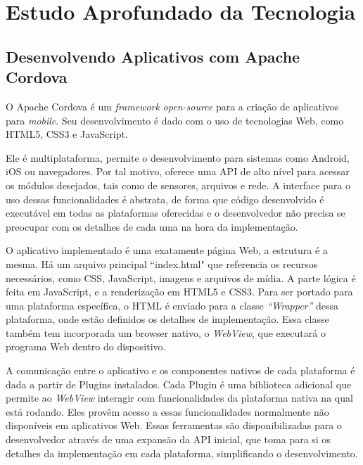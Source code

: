 \documentclass[a4paper,12pt]{article}
\begin{document}
%
%








\newpage

\section{Estudo Aprofundado da Tecnologia}

\subsection{Desenvolvendo Aplicativos com Apache Cordova}

O Apache Cordova é um \emph{framework} \emph{open-source} para a criação de aplicativos para \emph{mobile}. Seu desenvolvimento é dado com o uso de tecnologias Web, como HTML5, CSS3 e JavaScript.

Ele é multiplataforma, permite o desenvolvimento para sistemas como Android, iOS ou navegadores. Por tal motivo, oferece uma API de alto nível para acessar os módulos desejados, tais como de sensores, arquivos e rede. A interface para o uso dessas funcionalidades é abstrata, de forma que código desenvolvido é executável em todas as plataformas oferecidas e o desenvolvedor não precisa se preocupar com os detalhes de cada uma na hora da implementação.

O aplicativo implementado é uma exatamente página Web, a estrutura é a mesma. Há um arquivo principal “index.html" que referencia os recursos necessários, como CSS, JavaScript, imagens e arquivos de mídia. A parte lógica é feita em JavaScript, e a renderização em HTML5 e CSS3. Para ser portado para uma plataforma específica, o HTML é enviado para a classe \emph{“Wrapper”} dessa plataforma, onde estão definidos os detalhes de implementação. Essa classe também tem incorporada um browser nativo, o \emph{WebView}, que executará o programa Web dentro do dispositivo.

A comunicação entre o aplicativo e os componentes nativos de cada plataforma é dada a partir de Plugins instalados. Cada Plugin é uma biblioteca adicional que permite ao \emph{WebView} interagir com funcionalidades da plataforma nativa na qual está rodando. Eles provêm acesso a essas funcionalidades normalmente não disponíveis em aplicativos Web. Essas ferramentas são disponibilizadas para o desenvolvedor através de uma expansão da API inicial, que toma para si os detalhes da implementação em cada plataforma, simplificando o desenvolvimento.
\end{document}
